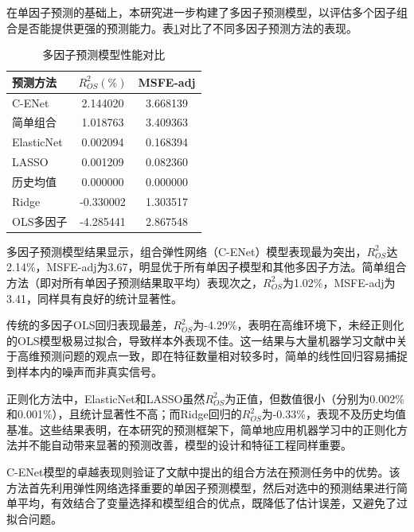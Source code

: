 \documentclass[12pt, a4paper]{article}
\begin{document}
在单因子预测的基础上，本研究进一步构建了多因子预测模型，以评估多个因子组合是否能提供更强的预测能力。表\ref{tab:multi_factor}对比了不同多因子预测方法的表现。

\begin{table}[htbp]
\centering
\caption{多因子预测模型性能对比}
\label{tab:multi_factor}
\begin{tabular}{lcc}
\toprule
预测方法 & $R^2_{OS}(\%)$ & MSFE-adj \\
\midrule
C-ENet & 2.144020 & 3.668139 \\
简单组合 & 1.018763 & 3.409363 \\
ElasticNet & 0.002094 & 0.168394 \\
LASSO & 0.001209 & 0.082360 \\
历史均值 & 0.000000 & 0.000000 \\
Ridge & -0.330002 & 1.303517 \\
OLS多因子 & -4.285441 & 2.867548 \\
\bottomrule
\end{tabular}
\end{table}

多因子预测模型结果显示，组合弹性网络（C-ENet）模型表现最为突出，$R^2_{OS}$达2.14\%，MSFE-adj为3.67，明显优于所有单因子模型和其他多因子方法。简单组合方法（即对所有单因子预测结果取平均）表现次之，$R^2_{OS}$为1.02\%，MSFE-adj为3.41，同样具有良好的统计显著性。

传统的多因子OLS回归表现最差，$R^2_{OS}$为-4.29\%，表明在高维环境下，未经正则化的OLS模型极易过拟合，导致样本外表现不佳。这一结果与大量机器学习文献中关于高维预测问题的观点一致，即在特征数量相对较多时，简单的线性回归容易捕捉到样本内的噪声而非真实信号。

正则化方法中，ElasticNet和LASSO虽然$R^2_{OS}$为正值，但数值很小（分别为0.002\%和0.001\%），且统计显著性不高；而Ridge回归的$R^2_{OS}$为-0.33\%，表现不及历史均值基准。这些结果表明，在本研究的预测框架下，简单地应用机器学习中的正则化方法并不能自动带来显著的预测改善，模型的设计和特征工程同样重要。

C-ENet模型的卓越表现则验证了文献中提出的组合方法在预测任务中的优势。该方法首先利用弹性网络选择重要的单因子预测模型，然后对选中的预测结果进行简单平均，有效结合了变量选择和模型组合的优点，既降低了估计误差，又避免了过拟合问题。
\end{document}
